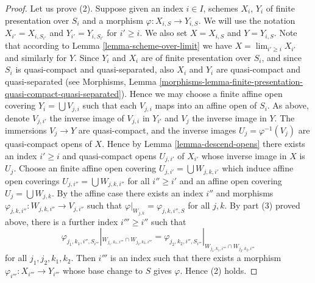 \documentclass{stacks-project}
\theoremstyle{plain}
\theoremstyle{definition}
\theoremstyle{remark}
\numberwithin{equation}{subsection}
\def\lim{\mathop{\mathrm{lim}}\nolimits}
\begin{document}
\begin{proof}
\medskip\noindent
Let us prove (2). Suppose given an index $i \in I$, schemes
$X_i$, $Y_i$ of finite presentation over $S_i$ and a morphism
$\varphi : X_{i, S} \to Y_{i, S}$. We will use the notation
$X_{i'} = X_{i, S_{i'}}$ and $Y_{i'} = Y_{i, S_{i'}}$ for
$i' \geq i$. We also set $X = X_{i, S}$ and $Y = Y_{i, S}$.
Note that according to Lemma \ref{lemma-scheme-over-limit} we have
$X = \lim_{i' \geq i} X_{i'}$ and similarly for $Y$.
Since $Y_i$ and $X_i$ are of finite presentation
over $S_i$, and since $S_i$ is quasi-compact and quasi-separated, also
$X_i$ and $Y_i$ are quasi-compact and quasi-separated
(see Morphisms,
Lemma \ref{morphisms-lemma-finite-presentation-quasi-compact-quasi-separated}).
Hence we may choose a finite affine open covering
$Y_i = \bigcup V_{j, i}$ such that each $V_{j, i}$ maps into
an affine open of $S_i$. As above, denote $V_{j, i'}$ the inverse
image of $V_{j, i}$ in $Y_{i'}$ and $V_j$ the inverse image in $Y$.
The immersions $V_j \to Y$ are quasi-compact, and the inverse images
$U_j = \varphi^{-1}(V_j)$ are quasi-compact opens of $X$.
Hence by Lemma \ref{lemma-descend-opens} there exists an index
$i' \geq i$ and quasi-compact opens $U_{j, i'}$ of $X_{i'}$
whose inverse image in $X$ is $U_j$. Choose an finite affine open covering
$U_{j, i'} = \bigcup W_{j, k, i'}$ which induce affine open
coverings $U_{j, i''} = \bigcup W_{j, k, i''}$
for all $i'' \geq i'$ and an affine open covering
$U_j = \bigcup W_{j, k}$. By the affine case there exists
an index $i''$ and morphisms
$\varphi_{j, k, i''} : W_{j, k, i''} \to V_{j, i''}$
such that
$\varphi|_{W_{j, k}} = \varphi_{j, k, i'', S}$ for all $j, k$.
By part (3) proved above, there is a further index $i''' \geq i''$
such that
$$
\varphi_{j_1, k_1, i'', S_{i'''}}|_{W_{j_1, k_1, i'''} \cap W_{j_2, k_2, i'''}}
=
\varphi_{j_2, k_2, i'', S_{i'''}}|_{W_{j_1, k_1, i'''} \cap W_{j_2, k_2, i'''}}
$$
for all $j_1, j_2, k_1, k_2$. Then $i'''$ is an index such that
there exists a morphism $\varphi_{i'''} : X_{i'''} \to Y_{i'''}$
whose base change to $S$ gives $\varphi$. Hence (2) holds.


\end{proof}
\end{document}
